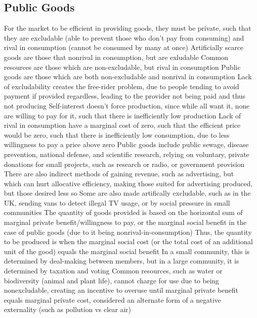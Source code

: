 \documentclass[11 pt, twoside]{article}
\newenvironment{outline*}
{
	\begin{outline}[enumerate]
	}
	{\end{outline}
}
\begin{document}
\subsection{Public Goods}
\begin{outline*}
\1 For the market to be efficient in providing goods, they must be private, such that they are excludable (able to prevent those who don't pay from consuming) and rival in consumption (cannot be consumed by many at once)
\2 Artificially scarce goods are those that nonrival in consumption, but are exludable
\2 Common resources are those which are non-excludable, but rival in consumption
\2 Public goods are those which are both non-excludable and nonrival in consumption
\2 Lack of excludability creates the free-rider problem, due to people tending to avoid payment if provided regardless, leading to the provider not being paid and thus not producing
\3 Self-interest doesn't force production, since while all want it, none are willing to pay for it, such that there is inefficiently low production
\2 Lack of rival in consumption have a marginal cost of zero, such that the efficient price would be zero, such that there is inefficiently low consumption, due to less willingness to pay a price above zero
\1 Public goods include public sewage, disease prevention, national defense, and scientific research, relying on voluntary, private donations for small projects, such as research or radio, or government provision
\2 There are also indirect methods of gaining revenue, such as advertising, but which can hurt allocative efficiency, making those suited for advertising produced, but those desired less so
\3 Some are also made artifically excludable, such as in the UK, sending vans to detect illegal TV usage, or by social pressure in small communities
\2 The quantity of goods provided is based on the horizontal sum of marginal private benefit/willingness to pay, or the marginal social benefit in the case of public goods (due to it being nonrival-in-consumption)
\3 Thus, the quantity to be produced is when the marginal social cost (or the total cost of an additional unit of the good) equals the marginal social benefit
\3 In a small community, this is determined by deal-making between members, but in a large community, it is determined by taxation and voting
\1 Common resources, such as water or biodiversity (animal and plant life), cannot charge for use due to being nonexcludable, creating an incentive to overuse until marginal private benefit equals marginal private cost, considered an alternate form of a negative externality (such as pollution vs clear air)

\end{outline*}
\end{document}
